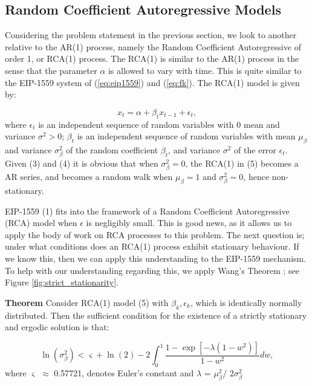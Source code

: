 \documentclass{article}
\begin{document}
\subsection{Random Coefficient Autoregressive Models}
\label{section:rca}

Considering the problem statement in the previous section, we look to another relative to the AR(1) process, namely the Random Coefficient Autoregressive of order 1, or RCA(1) process. The RCA(1) is similar to the AR(1) process in the sense that the parameter $\alpha$ is allowed to vary with time. This is quite similar to the EIP-1559 system of (\ref{eq:eip1559}) and (\ref{eq:fk}). The RCA(1) model is given by:

\begin{equation}
x_{t} = \alpha + \beta_{t}x_{t-1} + \epsilon_{t},
\label{eq:rca1}
\end{equation}
where ${\epsilon_{t}}$ is an independent sequence of random variables with 0 mean and variance $\sigma^2 > 0$; ${\beta_{t}}$ is an independent sequence of random variables with mean $\mu_{\beta}$ and variance $\sigma_{\beta}^2$ of the random coefficient $\beta_{t}$, and variance $\sigma^2$ of the error $\epsilon_{t}$. Given (3) and (4) it is obvious that when $\sigma_{\beta}^2 = 0$, the RCA(1) in (5) becomes a AR series, and becomes a random walk when $\mu_{\beta} = 1$ and $\sigma_{\beta}^2 = 0$, hence non-stationary. 

EIP-1559 (1) fits into the framework of a Random Coefficient Autoregressive (RCA) model when $\epsilon$ is negligibly small. This is good news, as it allows us to apply the body of work on RCA processes to this problem. The next question is; under what conditions does an RCA(1) process exhibit stationary behaviour. If we know this, then we can apply this understanding to the EIP-1559 mechanism. To help with our understanding regarding this, we apply Wang's Theorem \cite{Wan03}; see Figure \ref{fig:strict_stationarity}.

\textbf{Theorem} Consider RCA(1) model (5) with ${\beta_{k},\epsilon_{k}}$, which is identically normally distributed.  Then the sufficient condition for the existence of a strictly stationary and ergodic solution is that:

\begin{equation}
\ln(\sigma_{\beta}^2) < \varsigma + \ln(2) - 2 \int_{0}^{1}\frac{1 - \exp[-\lambda(1-w^2)]}{1-w^2}dw,
\label{eq:thm} 
\end{equation}
where $\varsigma$ $\approx$ 0.57721, denotes Euler’s constant and $\lambda$ = $\mu_{\beta}^2$/ $2\sigma_{\beta}^2$
\end{document}

